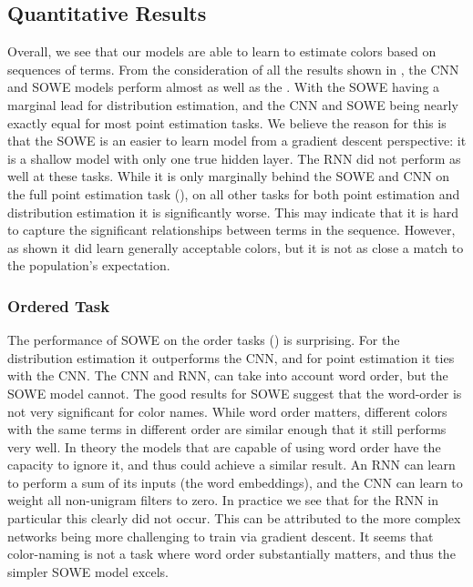\documentclass[11pt,a4paper]{article}
\begin{document}
\subsection{Quantitative Results}\label{sec:quantitative-results}

Overall, we see that our models are able to learn to estimate colors based on sequences of terms.
From the consideration of all the results shown in , 
the CNN and SOWE models perform almost as well as the \empmodel{}.
With the SOWE having a marginal lead for distribution estimation,
and the CNN and SOWE being nearly exactly equal for most point estimation tasks.
We believe the reason for this is that the SOWE is an easier to learn model from a gradient descent perspective:
it is a shallow model with only one true hidden layer.
The RNN did not perform as well at these tasks.
While it is only marginally behind the SOWE and CNN on the full point estimation task (), on all other tasks for both point estimation and distribution estimation it is significantly worse.
This may indicate that it is hard to capture the significant relationships between terms in the sequence.
However, as shown  it did learn generally acceptable colors, but it is not as close a match to the population's expectation.

\subsubsection{Ordered Task}
The performance of SOWE on the order tasks () is surprising.
For the distribution estimation it outperforms the CNN, and for point estimation it ties with the CNN.
The CNN and RNN, can take into account word order, but the SOWE model cannot.
The good results for SOWE suggest that the word-order is not very significant for color names.
While word order matters, different colors with the same terms in different order are similar enough that it still performs very well.
In theory the models that are capable of using word order have the capacity to ignore it, and thus could achieve a similar result.
An RNN can learn to perform a sum of its inputs (the word embeddings),
and the CNN can learn to weight all non-unigram filters to zero.
In practice we see that for the RNN in particular this clearly did not occur.
This can be attributed to the more complex networks being more challenging to train via gradient descent.
It seems that color-naming is not a task where word order substantially matters,
and thus the simpler SOWE model excels.
\end{document}
